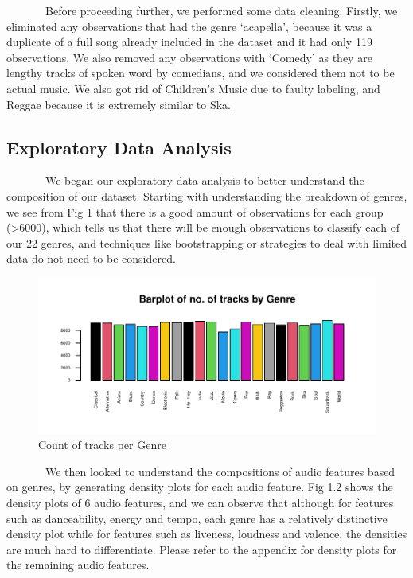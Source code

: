 \documentclass[
]{article}
\begin{document}
~~~~~~~Before proceeding further, we performed some data cleaning.
Firstly, we eliminated any observations that had the genre `acapella',
because it was a duplicate of a full song already included in the
dataset and it had only 119 observations. We also removed any
observations with `Comedy' as they are lengthy tracks of spoken word by
comedians, and we considered them not to be actual music. We also got
rid of Children's Music due to faulty labeling, and Reggae because it is
extremely similar to Ska.

\hypertarget{exploratory-data-analysis}{%
\subsection{Exploratory Data Analysis}\label{exploratory-data-analysis}}

~~~~~~~We began our exploratory data analysis to better understand the
composition of our dataset. Starting with understanding the breakdown of
genres, we see from Fig 1 that there is a good amount of observations
for each group (\textgreater6000), which tells us that there will be
enough observations to classify each of our 22 genres, and techniques
like bootstrapping or strategies to deal with limited data do not need
to be considered.

\begin{figure}
\centering
\includegraphics{write-up_files/figure-latex/count occurrences-1.pdf}
\caption{Count of tracks per Genre}
\end{figure}

~~~~~~~We then looked to understand the compositions of audio features
based on genres, by generating density plots for each audio feature. Fig
1.2 shows the density plots of 6 audio features, and we can observe that
although for features such as danceability, energy and tempo, each genre
has a relatively distinctive density plot while for features such as
liveness, loudness and valence, the densities are much hard to
differentiate. Please refer to the appendix for density plots for the
remaining audio features.
\end{document}
